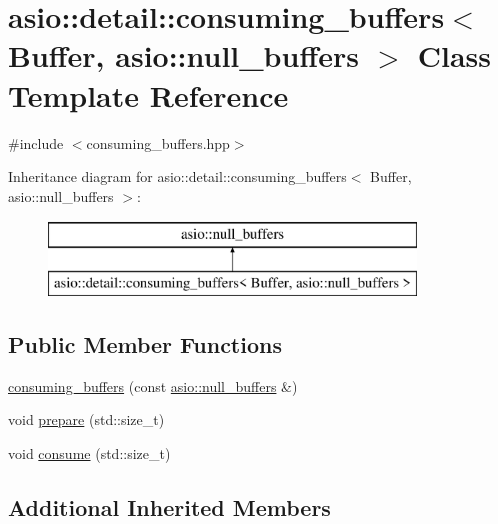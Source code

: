 \hypertarget{classasio_1_1detail_1_1consuming__buffers_3_01_buffer_00_01asio_1_1null__buffers_01_4}{}\section{asio\+:\+:detail\+:\+:consuming\+\_\+buffers$<$ Buffer, asio\+:\+:null\+\_\+buffers $>$ Class Template Reference}
\label{classasio_1_1detail_1_1consuming__buffers_3_01_buffer_00_01asio_1_1null__buffers_01_4}


{\ttfamily \#include $<$consuming\+\_\+buffers.\+hpp$>$}

Inheritance diagram for asio\+:\+:detail\+:\+:consuming\+\_\+buffers$<$ Buffer, asio\+:\+:null\+\_\+buffers $>$\+:\begin{figure}[H]
\begin{center}
\leavevmode
\includegraphics[height=2.000000cm]{classasio_1_1detail_1_1consuming__buffers_3_01_buffer_00_01asio_1_1null__buffers_01_4}
\end{center}
\end{figure}
\subsection*{Public Member Functions}
\begin{DoxyCompactItemize}
\item 
\hyperlink{classasio_1_1detail_1_1consuming__buffers_3_01_buffer_00_01asio_1_1null__buffers_01_4_aa51cc2fe38c0bdaa4fcc640db277df3a}{consuming\+\_\+buffers} (const \hyperlink{classasio_1_1null__buffers}{asio\+::null\+\_\+buffers} \&)
\item 
void \hyperlink{classasio_1_1detail_1_1consuming__buffers_3_01_buffer_00_01asio_1_1null__buffers_01_4_a1fa39060b25393602ffb0b1fe87d994b}{prepare} (std\+::size\+\_\+t)
\item 
void \hyperlink{classasio_1_1detail_1_1consuming__buffers_3_01_buffer_00_01asio_1_1null__buffers_01_4_af386224bbfde42eec769e4b045795110}{consume} (std\+::size\+\_\+t)
\end{DoxyCompactItemize}
\subsection*{Additional Inherited Members}


